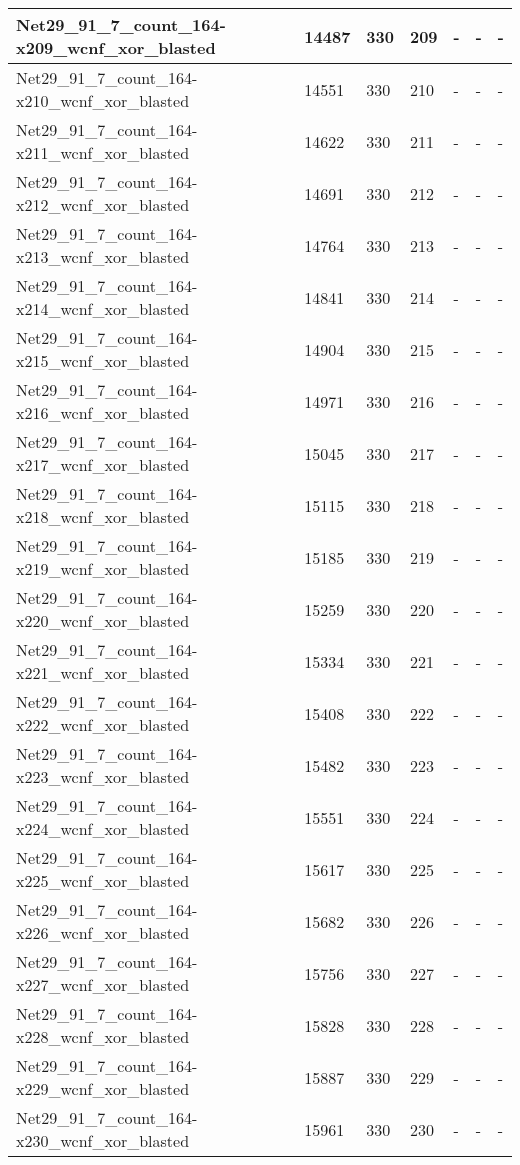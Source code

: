 \begin{scriptsize}
\begin{longtable}{|p{5cm}|l|l|l|l|l|l|}
Net29\_91\_7\_count\_164-x209\_wcnf\_xor\_blasted&14487&330&209&-&-&- \\ \hline 
Net29\_91\_7\_count\_164-x210\_wcnf\_xor\_blasted&14551&330&210&-&-&- \\ \hline 
Net29\_91\_7\_count\_164-x211\_wcnf\_xor\_blasted&14622&330&211&-&-&- \\ \hline 
Net29\_91\_7\_count\_164-x212\_wcnf\_xor\_blasted&14691&330&212&-&-&- \\ \hline 
Net29\_91\_7\_count\_164-x213\_wcnf\_xor\_blasted&14764&330&213&-&-&- \\ \hline 
Net29\_91\_7\_count\_164-x214\_wcnf\_xor\_blasted&14841&330&214&-&-&- \\ \hline 
Net29\_91\_7\_count\_164-x215\_wcnf\_xor\_blasted&14904&330&215&-&-&- \\ \hline 
Net29\_91\_7\_count\_164-x216\_wcnf\_xor\_blasted&14971&330&216&-&-&- \\ \hline 
Net29\_91\_7\_count\_164-x217\_wcnf\_xor\_blasted&15045&330&217&-&-&- \\ \hline 
Net29\_91\_7\_count\_164-x218\_wcnf\_xor\_blasted&15115&330&218&-&-&- \\ \hline 
Net29\_91\_7\_count\_164-x219\_wcnf\_xor\_blasted&15185&330&219&-&-&- \\ \hline 
Net29\_91\_7\_count\_164-x220\_wcnf\_xor\_blasted&15259&330&220&-&-&- \\ \hline 
Net29\_91\_7\_count\_164-x221\_wcnf\_xor\_blasted&15334&330&221&-&-&- \\ \hline 
Net29\_91\_7\_count\_164-x222\_wcnf\_xor\_blasted&15408&330&222&-&-&- \\ \hline 
Net29\_91\_7\_count\_164-x223\_wcnf\_xor\_blasted&15482&330&223&-&-&- \\ \hline 
Net29\_91\_7\_count\_164-x224\_wcnf\_xor\_blasted&15551&330&224&-&-&- \\ \hline 
Net29\_91\_7\_count\_164-x225\_wcnf\_xor\_blasted&15617&330&225&-&-&- \\ \hline 
Net29\_91\_7\_count\_164-x226\_wcnf\_xor\_blasted&15682&330&226&-&-&- \\ \hline 
Net29\_91\_7\_count\_164-x227\_wcnf\_xor\_blasted&15756&330&227&-&-&- \\ \hline 
Net29\_91\_7\_count\_164-x228\_wcnf\_xor\_blasted&15828&330&228&-&-&- \\ \hline 
Net29\_91\_7\_count\_164-x229\_wcnf\_xor\_blasted&15887&330&229&-&-&- \\ \hline 
Net29\_91\_7\_count\_164-x230\_wcnf\_xor\_blasted&15961&330&230&-&-&- \\ \hline 

\end{longtable}
\end{scriptsize}
